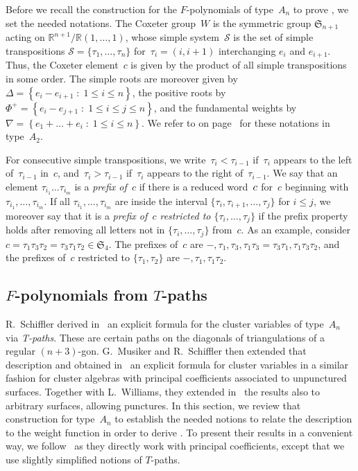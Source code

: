 \documentclass[10pt]{amsart}
\theoremstyle{definition}\newtheorem{rema}[theo]{Remark}\newtheorem{exem}[theo]{Example}
\newcommand{\RR}{\mathbb{R}}
\newcommand{\Sym}{{\mathfrak{S}}}
\newcommand{\Phiplus}{\Phi^+}
\newcommand{\Dfn}[1]{\emph{#1}}
\newcommand{\sq}[1]{{\rm #1}}
\newcommand{\sref}{\mathcal{S}}
\renewcommand{\c}{\sq{c}}
\newcommand{\set}[2]{\left\{ #1 \;:\; #2 \right\}}
\begin{document}
Before we recall the construction for the $F$-polynomials of type~$A_n$ to prove , we set the needed notations. The Coxeter group~$W$ is the symmetric group $\Sym_{n+1}$ acting on $\RR^{n+1} \big/ \RR(1,\dots,1)$, whose simple system~$\sref$ is the set of simple transpositions $\sref=\{\tau_1,\dots,\tau_n\}$ for~$\tau_i = (i,i+1)$ interchanging $e_i$ and $e_{i+1}$. Thus, the Coxeter element~$c$ is given by the product of all simple transpositions in some order. The simple roots are moreover given by $\Delta = \set{e_i - e_{i+1}}{1 \leq i \leq n}$, the positive roots by $\Phiplus = \set{ e_i - e_{j+1}}{1 \leq i \leq j \leq n}$, and the fundamental weights by $\nabla = \set{e_1+\dots+e_i}{1 \leq i \leq n}$. We refer to  on page~\pageref{ex:subwordA2} for these notations in type~$A_2$.

For consecutive simple transpositions, we write~$\tau_i < \tau_{i-1}$ if~$\tau_i$ appears to the left of~$\tau_{i-1}$ in~$c$, and~$\tau_i > \tau_{i-1}$ if~$\tau_i$ appears to the right of~$\tau_{i-1}$. We say that an element $\tau_{i_1} \dots \tau_{i_m}$ is a \Dfn{prefix of~$c$} if there is a reduced word~$\c$ for~$c$ beginning with~$\tau_{i_1},\dots,\tau_{i_m}$. If all $\tau_{i_1},\dots,\tau_{i_m}$ are inside the interval $\{\tau_i,\tau_{i+1},\dots,\tau_j\}$ for $i \leq j$, we moreover say that it is a \Dfn{prefix of~$c$ restricted to $\{\tau_i,\dots,\tau_j\}$} if the prefix property holds after removing all letters not in $\{\tau_i,\dots,\tau_j\}$ from~$c$. As an example, consider $c = \tau_1\tau_3\tau_2 = \tau_3\tau_1\tau_2 \in \Sym_{4}$. The prefixes of~$c$ are $-,\tau_1,\tau_3,\tau_1\tau_3 = \tau_3\tau_1,\tau_1\tau_3\tau_2$, and the prefixes of~$c$ restricted to $\{\tau_1,\tau_2\}$ are $-,\tau_1,\tau_1\tau_2$.

\subsection{\texorpdfstring{$F$}{F}-polynomials from \texorpdfstring{$T$}{T}-paths}\label{sec:fpolystpaths}

R.~Schiffler derived in~\cite{S2008} an explicit formula for the cluster variables of type~$A_n$ via \emph{T-paths}. These are certain paths on the diagonals of triangulations of a regular $(n+3)$-gon. G.~Musiker and R.~Schiffler then extended that description and obtained in~\cite{MS2010} an explicit formula for cluster variables in a similar fashion for cluster algebras with principal coefficients associated to unpunctured surfaces. Together with L.~Williams, they extended in~\cite{MSW2011} the results also to arbitrary surfaces, allowing punctures. In this section, we review that construction for type~$A_n$ to establish the needed notions to relate the description to the weight function in order to derive . To present their results in a convenient way, we follow~\cite[Section~5]{MS2010} as they directly work with principal coefficients, except that we use slightly simplified notions of $T$-paths.
\end{document}
